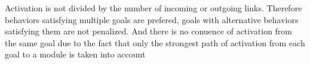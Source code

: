 Activation is not
divided by the number of incoming or outgoing links.
Therefore behaviors satisfying multiple goals are prefered, goals with alternative behaviors satisfying them are not penalized. And there is no conuence of activation
from the same goal due to the fact that only the
strongest path of activation from each goal to a module
is taken into account 
\begin{comment}
Länge: ca. 5-25 Seiten\\\\
In diesem Kapitel wird die Umsetzung des entwickelten Lösungskonzeptes in einer konkreten Umgebung, beispielsweise Systemumgebung dargestellt. Die Trennung in Lösungskonzept und Umsetzung ist Bestandteil strukturierten Arbeitens und wird konkret durch die Notwendigkeit begründet, das Lösungskonzept nicht durch Probleme zu verwässern, die bei der Umsetzung auftauchen können, aber keinen Einfluss auf die Anwendbarkeit des Lösungskonzepts haben. Ein typisches Beispiel sind hierfür politische Rahmenbedingungen usw.
\end{comment}
 
